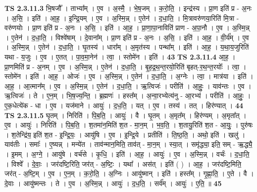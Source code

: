 \documentclass[17pt]{extarticle}
\begin{document}
                  \newline
                                \textbf{ TS 2.3.11.3} \newline
                  भि॒षजौ᳚ । ताभ्या᳚म् । ए॒व । अ॒स्मै॒ । भे॒ष॒जम् । क॒रो॒ति॒ । इन्द्र॑स्य । प्रा॒ण इति॑ प्र - अ॒नः । अ॒सि॒ । इति॑ । आ॒ह॒ । इ॒न्द्रि॒यम् । ए॒व । अ॒स्मि॒न्न् । ए॒तेन॑ । द॒धा॒ति॒ । मि॒त्रावरु॑णया॒रिति॑ मि॒त्रा - वरु॑णयोः । प्रा॒ण इति॑ प्र - अ॒नः । अ॒सि॒ । इति॑ । आ॒ह॒ । प्रा॒णा॒पा॒नाविति॑ प्राण - अ॒पा॒नौ । ए॒व । अ॒स्मि॒न्न् । ए॒तेन॑ । द॒धा॒ति॒ । विश्वे॑षाम् । दे॒वाना᳚म् । प्रा॒ण इति॑ प्र - अ॒नः । अ॒सि॒ । इति॑ । आ॒ह॒ । वी॒र्य᳚म् । ए॒व । अ॒स्मि॒न्न् । ए॒तेन॑ । द॒धा॒ति॒ । घृ॒तस्य॑ । धारा᳚म् । अ॒मृत॑स्य । पन्था᳚म् । इति॑ । आ॒ह॒ । य॒था॒य॒जुरिति॑ यथा - य॒जुः । ए॒व । ए॒तत् । पा॒व॒मा॒नेन॑ । त्वा॒ । स्तोमे॑न । इति॑ । \textbf{  43} \newline
                  \newline
                                \textbf{ TS 2.3.11.4} \newline
                  आ॒ह॒ । प्रा॒णमिति॑ प्र - अ॒नम् । ए॒व । अ॒स्मि॒न्न् । ए॒तेन॑ । द॒धा॒ति॒ । बृ॒ह॒द्र॒थ॒न्त॒रयो॒रिति॑ बृहत्-र॒थ॒न्त॒रयोः᳚ । त्वा॒ । स्तोमे॑न । इति॑ । आ॒ह॒ । ओजः॑ । ए॒व । अ॒स्मि॒न्न् । ए॒तेन॑ । द॒धा॒ति॒ । अ॒ग्नेः । त्वा॒ । मात्र॑या । इति॑ । आ॒ह॒ । आ॒त्मान᳚म् । ए॒व । अ॒स्मि॒न्न् । ए॒तेन॑ । द॒धा॒ति॒ । ऋ॒त्विजः॑ । परीति॑ । आ॒हुः॒ । याव॑न्तः । ए॒व । ऋ॒त्विजः॑ । ते । ए॒न॒म् । भि॒ष॒ज्य॒न्ति॒ । ब्र॒ह्मणः॑ । हस्त᳚म् । अ॒न्वा॒रभ्येत्य॑नु - आ॒रभ्य॑ । परीति॑ । आ॒हुः॒ । ए॒क॒धेत्ये॑क - धा । ए॒व । यज॑माने । आयुः॑ । द॒ध॒ति॒ । यत् । ए॒व । तस्य॑ । तत् । हिर॑ण्यात् । \textbf{  44} \newline
                  \newline
                                \textbf{ TS 2.3.11.5} \newline
                  घृ॒तम् । निरिति॑ । पि॒ब॒ति॒ । आयुः॑ । वै । घृ॒तम् । अ॒मृत᳚म् । हिर॑ण्यम् । अ॒मृता᳚त् । ए॒व । आयुः॑ । निरिति॑ । पि॒ब॒ति॒ । श॒तमा॑न॒मिति॑ श॒त - मा॒न॒म् । भ॒व॒ति॒ । श॒तायु॒रिति॑ श॒त - आ॒युः॒ । पुरु॑षः । श॒तेन्द्रि॑य॒ इति॑ श॒त - इ॒न्द्रि॒यः॒ । आयु॑षि । ए॒व । इ॒न्द्रि॒ये । प्रतीति॑ । ति॒ष्ठ॒ति॒ । अथो॒ इति॑ । खलु॑ । याव॑तीः । समाः᳚ । ए॒ष्यन्न् । मन्ये॑त । ताव॑न्मान॒मिति॒ ताव॑त् - मा॒न॒म् । स्या॒त् । समृ॑द्ध्या॒ इति॒ सम् - ऋ॒द्ध्यै॒ । इ॒मम् । अ॒ग्ने॒ । आयु॑षे । वर्च॑से । कृ॒धि॒ । इति॑ । आ॒ह॒ । आयुः॑ । ए॒व । अ॒स्मि॒न्न् । वर्चः॑ । द॒धा॒ति॒ । विश्वे᳚ । दे॒वाः॒ । जर॑दष्टि॒रिति॒ जर॑त् - अ॒ष्टिः॒ । यथा᳚ । अस॑त् । इति॑ ( ) । आ॒ह॒ । जर॑दष्टि॒मिति॒ जर॑त् - अ॒ष्टि॒म् । ए॒व । ए॒न॒म् । क॒रो॒ति॒ । अ॒ग्निः । आयु॑ष्मान् । इति॑ । हस्त᳚म् । गृ॒ह्णा॒ति॒ । ए॒ते । वै । दे॒वाः । आयु॑ष्मन्तः । ते । ए॒व । अ॒स्मि॒न्न् । आयुः॑ । द॒ध॒ति॒ । सर्व᳚म् । आयुः॑ । ए॒ति॒ ॥ \textbf{  45} \newline
\end{document}
